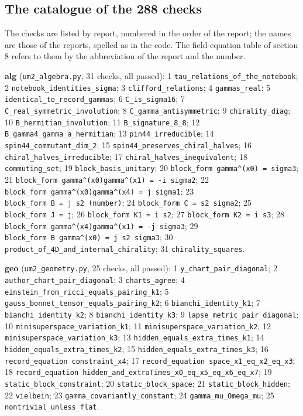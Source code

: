 \documentclass[
  10pt,
]{article}
\begin{document}
\hypertarget{the-catalogue-of-the-288-checks}{%
\subsection{The catalogue of the 288
checks}\label{the-catalogue-of-the-288-checks}}

The checks are listed by report, numbered in the order of the report;
the names are those of the reports, spelled as in the code. The
field-equation table of section 8 refers to them by the abbreviation of
the report and the number.

\begingroup\raggedright

\textbf{alg} (\texttt{um2\_algebra.py}, 31 checks, all passed): 1
\texttt{tau\_relations\_of\_the\_notebook}; 2
\texttt{notebook\_identities\_sigma}; 3 \texttt{clifford\_relations}; 4
\texttt{gammas\_real}; 5 \texttt{identical\_to\_record\_gammas}; 6
\texttt{C\_is\_sigma16}; 7 \texttt{C\_real\_symmetric\_involution}; 8
\texttt{C\_gamma\_antisymmetric}; 9 \texttt{chirality\_diag}; 10
\texttt{B\_hermitian\_involution}; 11 \texttt{B\_signature\_8\_8}; 12
\texttt{B\_gamma4\_gamma\_a\_hermitian}; 13 \texttt{pin44\_irreducible};
14 \texttt{spin44\_commutant\_dim\_2}; 15
\texttt{spin44\_preserves\_chiral\_halves}; 16
\texttt{chiral\_halves\_irreducible}; 17
\texttt{chiral\_halves\_inequivalent}; 18 \texttt{commuting\_set}; 19
\texttt{block\_basis\_unitary}; 20
\texttt{block\_form\ gamma\^{}(x0)\ =\ sigma3}; 21
\texttt{block\_form\ gamma\^{}(x0)gamma\^{}(x1)\ =\ -i\ sigma2}; 22
\texttt{block\_form\ gamma\^{}(x0)gamma\^{}(x4)\ =\ j\ sigma1}; 23
\texttt{block\_form\ B\ =\ j\ s2\ (number)}; 24
\texttt{block\_form\ C\ =\ s2\ sigma2}; 25
\texttt{block\_form\ J\ =\ j}; 26 \texttt{block\_form\ K1\ =\ i\ s2}; 27
\texttt{block\_form\ K2\ =\ i\ s3}; 28
\texttt{block\_form\ gamma\^{}(x4)gamma\^{}(x1)\ =\ -j\ sigma3}; 29
\texttt{block\_form\ B\ gamma\^{}(x0)\ =\ j\ s2\ sigma3}; 30
\texttt{product\_of\_4D\_and\_internal\_chirality}; 31
\texttt{chirality\_squares}.

\textbf{geo} (\texttt{um2\_geometry.py}, 25 checks, all passed): 1
\texttt{y\_chart\_pair\_diagonal}; 2
\texttt{author\_chart\_pair\_diagonal}; 3 \texttt{charts\_agree}; 4
\texttt{einstein\_from\_ricci\_equals\_pairing\_k1}; 5
\texttt{gauss\_bonnet\_tensor\_equals\_pairing\_k2}; 6
\texttt{bianchi\_identity\_k1}; 7 \texttt{bianchi\_identity\_k2}; 8
\texttt{bianchi\_identity\_k3}; 9
\texttt{lapse\_metric\_pair\_diagonal}; 10
\texttt{minisuperspace\_variation\_k1}; 11
\texttt{minisuperspace\_variation\_k2}; 12
\texttt{minisuperspace\_variation\_k3}; 13
\texttt{hidden\_equals\_extra\_times\_k1}; 14
\texttt{hidden\_equals\_extra\_times\_k2}; 15
\texttt{hidden\_equals\_extra\_times\_k3}; 16
\texttt{record\_equation\ constraint\_x4}; 17
\texttt{record\_equation\ space\_x1\_eq\_x2\_eq\_x3}; 18
\texttt{record\_equation\ hidden\_and\_extraTimes\_x0\_eq\_x5\_eq\_x6\_eq\_x7};
19 \texttt{static\_block\_constraint}; 20 \texttt{static\_block\_space};
21 \texttt{static\_block\_hidden}; 22 \texttt{vielbein}; 23
\texttt{gamma\_covariantly\_constant}; 24 \texttt{gamma\_mu\_Omega\_mu};
25 \texttt{nontrivial\_unless\_flat}.
\end{document}
